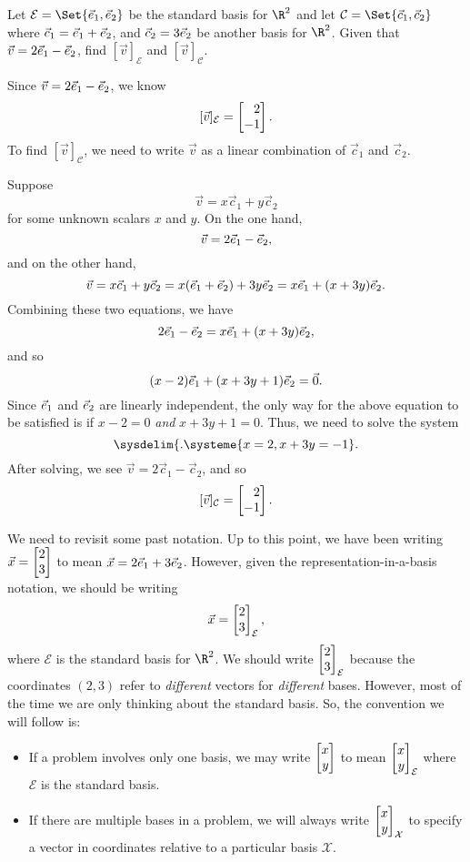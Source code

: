 
\begin{example}
	Let $\mathcal E=\Set{\xhat,\yhat}$ be the standard basis for $\R^2$ and let $\mathcal C=\Set{\vec c_1,\vec c_2}$
	where $\vec c_1={\vec e_1}+{\vec e_2}$, and $\vec c_2 =3{\vec e_2}$ be another basis for $\R^2$. Given that $\vec v=2{\vec e_1}-{\vec e_2}$, 
	find $[\vec v]_{\mathcal E}$ and $[\vec v]_{\mathcal C}$.

	Since $\vec v=2{\vec e_1}-{\vec e_2}$, we know
	\[
	    [\vec v]_{\mathcal E}=\mat{2\\-1}.
	\]
	To find $[\vec v]_{\mathcal C}$, we need to write $\vec v$ as a linear combination of $\vec c_1$ and $\vec c_2$. 
	
	Suppose
	\[
		\vec v = x\vec c_1 + y\vec c_2    
	\]
	for some unknown scalars $x$ and $y$. On the one hand,
	\[
	    \vec v = 2{\vec e_1}-{\vec e_2},
	\]
	and on the other hand, 
	\[
	    \vec v  = x\vec c_1 + y\vec c_2= x({\vec e_1}+{\vec e_2})+3y{\vec e_2}=x{\vec e_1}+(x+3y){\vec e_2}.
	\]
	Combining these two equations, we have
	\[
	    2{\vec e_1}-{\vec e_2} = x{\vec e_1}+(x+3y){\vec e_2},
	\]
	and so
	\[
		(x-2){\vec e_1}+(x+3y+1){\vec e_2} = \vec 0. 
	\]
	Since ${\vec e_1}$ and ${\vec e_2}$ are linearly independent, the only way for the above equation to be satisfied is if
	$x-2=0$ \emph{and} $x+3y+1=0$. Thus, we need to solve the system
	\[
	    \sysdelim\{.
		\systeme{
			x=2,
			x+3y=-1
		}.
	\]
	After solving, we see $\vec v=2\vec c_1 - \vec c_2$, and so
	\[
	   [\vec v]_{\mathcal C}=\mat{2\\-1}. 
	\]
\end{example}

We need to revisit some past notation. Up to this point, we have been writing $\vec x=\mat{2\\3}$ to mean
$\vec x=2{\vec e_1}+3{\vec e_2}$. However, given the representation-in-a-basis notation, we should be writing
\[
	\vec x=\mat{2\\3}_{\mathcal E},
\]
where $\mathcal E$ is the standard basis for $\R^2$. We should write $\mat{2\\3}_{\mathcal E}$ because the coordinates $(2,3)$
refer to \emph{different} vectors for \emph{different} bases. However, most of the time we are only thinking about the standard
basis. So, the convention we will follow is:
\begin{itemize}
	\item If a problem involves only one basis, we may write $\mat{x\\y}$ to mean $\mat{x\\y}_{\mathcal E}$ where
	$\mathcal E$ is the standard basis.
	\item If there are multiple bases in a problem, we will always write $\mat{x\\y}_{\mathcal X}$ to specify a vector in
	coordinates relative to a particular basis $\mathcal X$.
\end{itemize}

